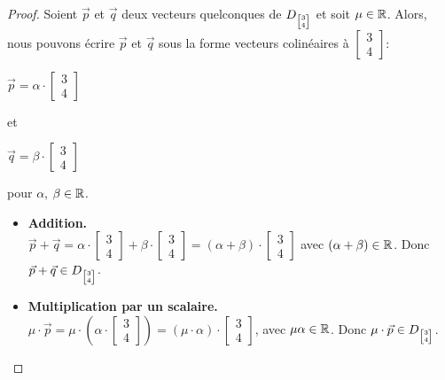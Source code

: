 \begin{proof}
    Soient $\vec{p}$ et $\vec{q}$ deux vecteurs quelconques de $D_{\tiny \begin{bmatrix} 3\\4\end{bmatrix}}$ et soit $\mu \in \mathbb{R}$. Alors, nous pouvons écrire $\vec{p}$ et $\vec{q}$ sous la forme vecteurs colinéaires à $\begin{bmatrix} 3\\4\end{bmatrix}$:
    
    \begin{center}
    $\vec{p} = \alpha \cdot \begin{bmatrix} 3\\4\end{bmatrix}$
    
    et
    
    $\vec{q} = \beta \cdot \begin{bmatrix} 3\\4\end{bmatrix}$
    \end{center}
    
    pour $\alpha$, $\beta \in \mathbb{R}$.
    
    \begin{itemize}
        \item \textbf{Addition.}\\$\vec{p} + \vec{q} = \alpha \cdot \begin{bmatrix} 3\\4\end{bmatrix} + \beta \cdot \begin{bmatrix} 3\\4\end{bmatrix} = (\alpha + \beta) \cdot \begin{bmatrix} 3\\4\end{bmatrix}$ avec $(\alpha + \beta) \in \mathbb{R}$. Donc $\vec{p} + \vec{q} \in D_{\tiny \begin{bmatrix} 3\\4\end{bmatrix}}$.
        \item \textbf{Multiplication par un scalaire.}\\$\mu \cdot \vec{p} = \mu \cdot (\alpha \cdot \begin{bmatrix} 3\\4\end{bmatrix}) = (\mu \cdot \alpha) \cdot \begin{bmatrix} 3\\4\end{bmatrix}$, avec $\mu\alpha \in \mathbb{R}$. Donc $\mu \cdot \vec{p} \in D_{\tiny \begin{bmatrix} 3\\4\end{bmatrix}}$.
    \end{itemize}
\end{proof}

